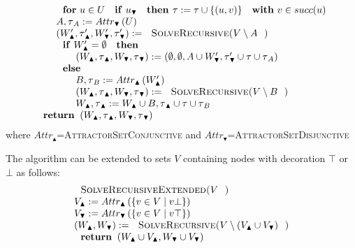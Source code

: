 \begin{equation*}
\begin{array}{l}
\qquad \text{\textbf{for} }u\in U\text{ \textbf{if} }u_{\blacktriangledown }%
\text{ \textbf{then }}\tau :=\tau \cup \{(u,v)\}\text{ \textbf{with} }v\in
succ(u) \\ 
\qquad A,\tau _{A}:=Attr_{\blacktriangledown }\left( U\right)  \\ 
\qquad \left( W_{\blacktriangle }^{\prime },\tau _{\blacktriangle }^{\prime
},W_{\blacktriangledown }^{\prime },\tau _{\blacktriangledown }^{\prime
}\right) :=\text{\textsc{SolveRecursive(}}V\setminus A\text{)} \\ 
\qquad \text{\textbf{if} }W_{\blacktriangle }^{\prime }=\emptyset \text{ 
\textbf{then}} \\ 
\qquad \qquad \left( W_{\blacktriangle },\tau _{\blacktriangle
},W_{\blacktriangledown },\tau _{\blacktriangledown }\right) :=\left(
\emptyset ,\emptyset ,A\cup W_{\blacktriangledown }^{\prime },\tau
_{\blacktriangledown }^{\prime }\cup \tau \cup \tau _{A}\right)  \\ 
\qquad \text{\textbf{else}} \\ 
\qquad \qquad B,\tau _{B}:=Attr_{\blacktriangle }\left( W_{\blacktriangle
}^{\prime }\right)  \\ 
\qquad \qquad \left( W_{\blacktriangle },\tau _{\blacktriangle
},W_{\blacktriangledown },\tau _{\blacktriangledown }\right) :=\text{\textsc{%
SolveRecursive(}}V\setminus B\text{)} \\ 
\qquad \qquad W_{\blacktriangle },\tau _{\blacktriangle }:=W_{\blacktriangle
}\cup B,\tau _{\blacktriangle }\cup \tau \cup \tau _{B} \\ 
\text{\textbf{return }}\left( W_{\blacktriangle },\tau _{\blacktriangle
},W_{\blacktriangledown },\tau _{\blacktriangledown }\right) 
\end{array}%
\end{equation*}%
where $Attr_{\blacktriangle }$=\textsc{AttractorSetConjunctive} and $%
Attr_{\blacktriangledown }$=\textsc{AttractorSetDisjunctive}

The algorithm can be extended to sets $V$ containing nodes with decoration $%
\top $ or $\bot $ as follows:%
\begin{equation*}
\begin{array}{l}
\text{\textsc{SolveRecursiveExtended(}}V\text{\textsc{)}} \\ 
V_{\blacktriangle }:=Attr_{\blacktriangle }\left( \{v\in V\mid v\bot
\}\right) \\ 
V_{\blacktriangledown }:=Attr_{\blacktriangledown }\left( \{v\in V\mid v\top
\}\right) \\ 
\left( W_{\blacktriangle },W_{\blacktriangledown }\right) :=\text{\textsc{%
SolveRecursive(}}V\setminus (V_{\blacktriangle }\cup V_{\blacktriangledown })%
\text{\textsc{)}} \\ 
\text{\textbf{return }}\left( W_{\blacktriangle }\cup V_{\blacktriangle
},W_{\blacktriangledown }\cup V_{\blacktriangledown }\right)%
\end{array}%
\end{equation*}%
\newpage
